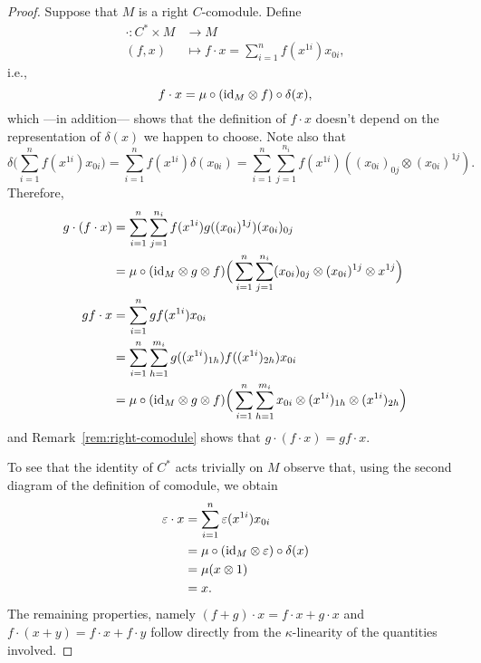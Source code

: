 \begin{proof}
    Suppose that $M$ is a right $C$-comodule. Define
    \begin{align*}
        \cdot\colon C^*\times M&\to M\\
            (f,x) &\mapsto f\cdot x=\sum_{i=1}^nf(x^{1i})x_{0i},
    \end{align*}
    i.e.,
    $$
        f\cdot x=\mu\circ(\text{\rm id}_M\otimes f)\circ\delta(x),
    $$
    which ---in addition--- shows that the definition of $f\cdot x$ doesn't depend on the representation of $\delta(x)$ we happen to choose. Note also that
    $$
        \delta\Big(\sum_{i=1}^nf(x^{1i})x_{0i}\Big)
            = \sum_{i=1}^nf(x^{1i})\delta(x_{0i})
            = \sum_{i=1}^n\sum_{j=1}^{n_i}
                f(x^{1i})((x_{0i})_{0j}\otimes(x_{0i})^{1j}).
    $$
    Therefore,
    \begin{align*}
        g\cdot(f\cdot x) &= \sum_{i=1}^n\sum_{j=1}^{n_i}
                f(x^{1i})g((x_{0i})^{1j})(x_{0i})_{0j}\\
            &= \mu\circ(\text{\rm id}_M\otimes g\otimes f)\Big(
                \sum_{i=1}^n\sum_{j=1}^{n_i}
                (x_{0i})_{0j}\otimes(x_{0i})^{1j}\otimes x^{1j}\Big)\\
        gf\cdot x &= \sum_{i=1}^ngf(x^{1i})x_{0i}\\
            &= \sum_{i=1}^n\sum_{h=1}^{m_i}
                g((x^{1i})_{1h})f((x^{1i})_{2h})x_{0i}\\
            &= \mu\circ(\text{\rm id}_M\otimes g\otimes f)\Big(
                 \sum_{i=1}^n\sum_{h=1}^{m_i}
                 x_{0i}\otimes(x^{1i})_{1h}\otimes(x^{1i})_{2h}\Big)
    \end{align*}
    and Remark~\ref{rem:right-comodule} shows that $g\cdot(f\cdot x) = gf\cdot x$.

    To see that the identity of $C^*$ acts trivially on $M$ observe that, using the second diagram of the definition of comodule, we obtain
    \begin{align*}
        \varepsilon\cdot x &= \sum_{i=1}^n\varepsilon(x^{1i})x_{0i}\\
            &= \mu\circ(\text{\rm id}_M\otimes\varepsilon)\circ\delta(x)\\
            &= \mu(x\otimes1)\\
            &= x.
    \end{align*}
    The remaining properties, namely $(f+g)\cdot x=f\cdot x + g\cdot x$ and $f\cdot (x+y) = f\cdot x + f\cdot y$ follow directly from the $\kappa$-linearity of the quantities involved.
\end{proof}

